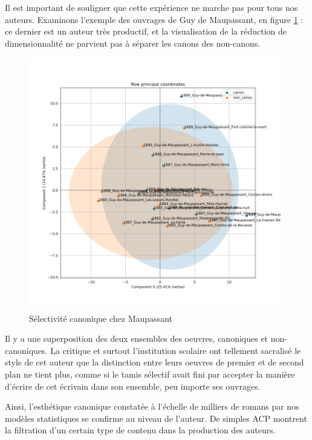 Il est important de souligner que cette expérience ne marche pas pour tous nos auteurs. Examinons l'exemple des ouvrages de Guy de Maupassant, en figure \ref{maupa} : ce dernier est un auteur très productif, et la visualisation de la réduction de dimensionnalité ne parvient pas à séparer les canons des non-canons.

\bigskip
\begin{figure}[!ht]
    \centering
    \includegraphics[width=11cm]{img/17_pca_Maupassant.png}
    \caption{Sélectivité canonique chez Maupassant}
    \label{maupa}
\end{figure}

Il y a une superposition des deux ensembles des oeuvres, canoniques et non-canoniques. La critique et surtout l'institution scolaire ont tellement sacralisé le style de cet auteur que la distinction entre leurs oeuvres de premier et de second plan ne tient plus, comme si le tamis sélectif avait fini par accepter la manière d'écrire de cet écrivain dans son ensemble, peu importe ses ouvrages. 

Ainsi, l'esthétique canonique constatée à l'échelle de milliers de romans par nos modèles statistiques se confirme au niveau de l'auteur. De simples ACP montrent la filtration d'un certain type de contenu dans la production des auteurs. 